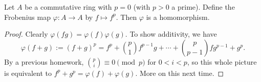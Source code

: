 \begin{lemma}
    Let $A$ be a commutative ring  with $p=0$ (with $p>0$ a prime). Define the Frobenius map $\varphi  \colon A \to A$ by $f \mapsto  f^p$. Then $\varphi $ is a homomorphism.
\end{lemma}
\begin{proof}
    Clearly $\varphi (fg)=\varphi (f)\varphi (g)$. To show additivity, we have \[
        \varphi (f+g):=(f+g)^p=f^p+ {p \choose 1} f^{p-1}g+ \cdots +{p\choose p-1} fg^{p-1}+g^p.
    \] By a previous homework, ${p\choose i} \equiv 0 \pmod p$ for $0 < i <p$, so this whole picture is equivalent to $f^p + g^p=\varphi (f)+\varphi (g)$. More on this next time.
\end{proof}
